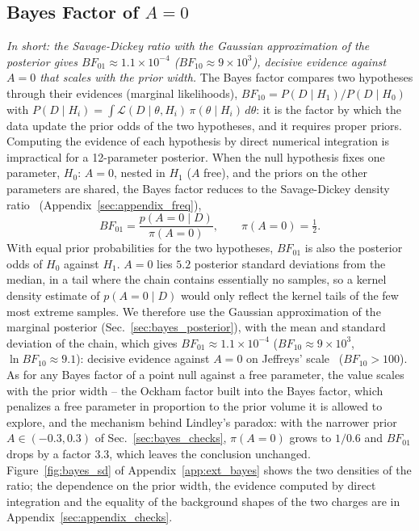 \subsection{Bayes Factor of $A=0$}
\emph{In short: the Savage-Dickey ratio with the Gaussian approximation of the posterior gives $BF_{01}\approx1.1\times10^{-4}$ ($BF_{10}\approx9\times10^3$), decisive evidence against $A=0$ that scales with the prior width.}
The Bayes factor compares two hypotheses through their evidences (marginal likelihoods), $BF_{10}=P(D\mid H_1)/P(D\mid H_0)$ with $P(D\mid H_i)=\int\mathcal{L}(D\mid\theta,H_i)\,\pi(\theta\mid H_i)\,d\theta$: it is the factor by which the data update the prior odds of the two hypotheses, and it requires proper priors. Computing the evidence of each hypothesis by direct numerical integration is impractical for a 12-parameter posterior. When the null hypothesis fixes one parameter, $H_0$: $A=0$, nested in $H_1$ ($A$ free), and the priors on the other parameters are shared, the Bayes factor reduces to the Savage-Dickey density ratio~\cite{dickey1971} (Appendix~\ref{sec:appendix_freq}),
\[
BF_{01} = \frac{p(A=0\mid D)}{\pi(A=0)}, \qquad \pi(A=0)=\tfrac12 .
\]
With equal prior probabilities for the two hypotheses, $BF_{01}$ is also the posterior odds of $H_0$ against $H_1$. $A=0$ lies $5.2$ posterior standard deviations from the median, in a tail where the chain contains essentially no samples, so a kernel density estimate of $p(A=0\mid D)$ would only reflect the kernel tails of the few most extreme samples. We therefore use the Gaussian approximation of the marginal posterior (Sec.~\ref{sec:bayes_posterior}), with the mean and standard deviation of the chain, which gives $BF_{01}\approx1.1\times10^{-4}$ ($BF_{10}\approx9\times10^{3}$, $\ln BF_{10}\approx9.1$): decisive evidence against $A=0$ on Jeffreys' scale~\cite{jeffreys} ($BF_{10}>100$). As for any Bayes factor of a point null against a free parameter, the value scales with the prior width -- the Ockham factor built into the Bayes factor, which penalizes a free parameter in proportion to the prior volume it is allowed to explore, and the mechanism behind Lindley's paradox: with the narrower prior $A\in(-0.3,0.3)$ of Sec.~\ref{sec:bayes_checks}, $\pi(A=0)$ grows to $1/0.6$ and $BF_{01}$ drops by a factor $3.3$, which leaves the conclusion unchanged. Figure~\ref{fig:bayes_sd} of Appendix~\ref{app:ext_bayes} shows the two densities of the ratio; the dependence on the prior width, the evidence computed by direct integration and the equality of the background shapes of the two charges are in Appendix~\ref{sec:appendix_checks}.

